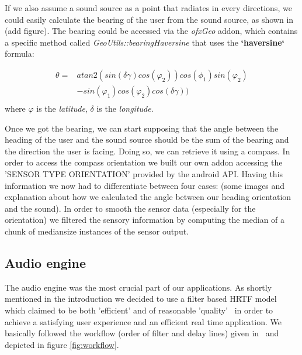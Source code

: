 \documentclass[journal]{IEEEtran}
\begin{document}
If we also assume a sound source as a point that radiates in every directions, we could easily calculate the bearing of the user from the sound source, as shown in (add figure). The bearing could be accessed via the \emph{ofxGeo} addon, which contains a specific method called \emph{GeoUtils::bearingHaversine} that uses the \textbf{`haversine`} formula:

\begin{equation*}\label{eq:haversine}
\begin{split}
	\theta = & atan2(sin (\delta \gamma)cos(\varphi_2)) cos(\phi_1)sin(\varphi_2)\\
	&-sin(\varphi_1)cos(\varphi_2)cos(\delta \gamma)) \\
\end{split}
\end{equation*}
where $\varphi$ is the \emph{latitude}, $\delta$ is the \emph{longitude}.

Once we got the bearing, we can start supposing that the angle between the heading of the user and the sound source should be the sum of the bearing and the direction the user is facing. Doing so, we can retrieve it using a compass. In order to access the compass orientation we built our own addon accessing the 'SENSOR TYPE ORIENTATION' provided by the android API. Having this information we now had to differentiate between four cases: (some images and explanation about how we calculated the angle between our heading orientation and the sound). In order to smooth the sensor data (especially for the orientation) we filtered the sensory information by computing the median of a chunk of mediansize instances of the sensor output. 

\subsection{Audio engine}
The audio engine was the most crucial part of our applications. As shortly mentioned in the introduction we decided to use a filter based HRTF model which claimed to be both 'efficient' and of reasonable 'quality'~\cite{Brown1997} in order to achieve a satisfying user experience and an efficient real time application. We basically followed the workflow (order of filter and delay lines) given in~\cite{Brown1997} and depicted in figure \ref{fig:workflow}. 
\end{document}
